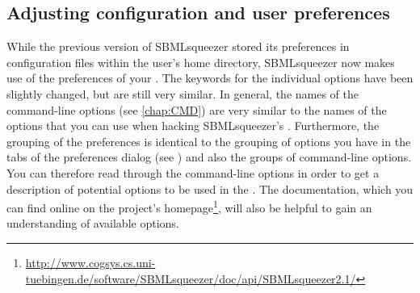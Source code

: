\subsection{Adjusting configuration and user preferences}

While the previous version of SBMLsqueezer stored its preferences in configuration files within the user's home directory, SBMLsqueezer now makes use of the preferences of your \OS.
The keywords for the individual options have been slightly changed, but are still very similar.
In general, the names of the command-line options (see \vref{chap:CMD}) are very similar to the names of the options that you can use when hacking SBMLsqueezer's \API.
Furthermore, the grouping of the preferences is identical to the grouping of options you have in the tabs of the preferences dialog (see ) and also the groups of command-line options.
You can therefore read through the command-line options in order to get a description of potential options to be used in the \API.
The \Java \API documentation, which you can find online on the project's homepage\footnote{\url{http://www.cogsys.cs.uni-tuebingen.de/software/SBMLsqueezer/doc/api/SBMLsqueezer2.1/}}, will also be helpful to gain an understanding of available options.

